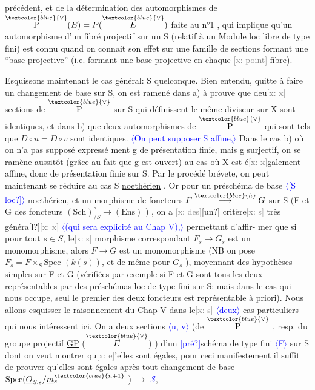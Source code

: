 \documentclass[11pt]{article}
\newcommand{\scanpage}[1]{\par\bigskip\noindent{\small\sffamily[scan #1]}\par}
\newcommand{\mspage}[1]{{\small\sffamily[p.\,#1]}}
\newcommand{\hand}[1]{\textcolor{blue}{#1}}
\newcommand{\inserted}[2][]{\textcolor{blue}{$\langle$#2$\rangle$}}
\newcommand{\xout}[1]{\textcolor{gray}{[\textsf{x:} #1]}}
\newcommand{\uline}[1]{\underline{#1}}
\newcommand{\unsure}[1]{[#1?]}
\begin{document}
\mspage{128}

\clearpage
\scanpage{25/129}
\mspage{32}

précédent, et de la détermination des automorphismes de $\overset{\hand{\vee}}{\mathrm{P}}(E) = P(\overset{\hand{\vee}}{E})$ faite
au n°1 , qui implique qu'un automorphisme d'un fibré projectif sur un S
(relatif à un Module loc libre de type fini)  est connu quand on connait
son effet sur une famille de sections formant une ``base projective''
(i.e. formant une base projective en chaque \xout{point} fibre).

Esquissons maintenant le cas général: S quelconque.  Bien entendu,
quitte à faire un changement de base sur S, on est ramené dans a) à prouve
que deu\xout{x} sections  de $\overset{\hand{\vee}}{\mathrm{P}}$ sur S  qu\uline{i} définissent le même diviseur sur X sont
identiques, et dans b) que deux automorphismes  de $\overset{\hand{\vee}}{\mathrm{P}}$  qui sont tels que
$D\circ u = D\circ v$  sont identiques. \inserted[typed]{On peut supposer  S affine,} Dans le cas b) où on n'a pas supposé expressé%
ment  g de présentation finie, mais g surjectif, on se ramène aussitôt
(grâce au fait que g est ouvert) au cas où X est é\xout{x}galement affine, donc
de présentation finie sur S.  Par le procédé brévete, on peut maintenant
se réduire au cas S \uline{noethérien} .  Or pour un préschéma de base \inserted{\unsure{S loc}} noethérien,
et un morphisme de foncteurs  $F \overset{\hand{h}}{\longrightarrow} G$ sur S  (F et G des foncteurs
$(\mathrm{Sch})_{/S}^{\circ} \longrightarrow (\mathrm{Ens})$ ) ,  on a \xout{des}\unsure{un} critère\xout{s} très généra\unsure{l}\xout{x} \inserted[typed]{(qui sera explicité au Chap V),} permettant d'affir-%
mer que si  pour tout  $s \in S$, le\xout{s} morphisme correspondant $F_s \longrightarrow G_s$ est
un monomorphisme, alors $F \longrightarrow G$ est un monomorphisme  (NB on pose $F_s{=}F\times_S\mathrm{Spec}$
$(k(s))$, et de même pour $G_s$ ),  moyennant des hypothèses simples sur F et G
(vérifiées par exemple si F et G sont tous les deux représentables par des
préschémas loc de type fini sur S; mais dans le cas qui nous occupe, seul
le premier des deux foncteurs est représentable à priori).  Nous allons
esquisser le raisonnement du Chap V  dans le\xout{s} \inserted[typed]{deux} cas particuliers qui nous
intéressent ici.  On a deux sections \inserted{u, v} (de $\overset{\hand{\vee}}{\mathrm{P}}$ , resp. du groupe projectif
\uline{GP} ($\overset{\hand{\vee}}{E}$) ) d'un \hand{\unsure{pré}}schéma de type fini \inserted{F} sur S dont on veut montrer qu\xout{e}'elles
sont égales, pour ceci manifestement il suffit de prouver qu'elles sont
égales après tout changement de base  $\mathrm{Spec}(\underline{O}_{S,s}/\underline{m}_s^{\hand{n+1}}$ ) $\longrightarrow$ \hand{$\mathcal{S}$},
\end{document}
